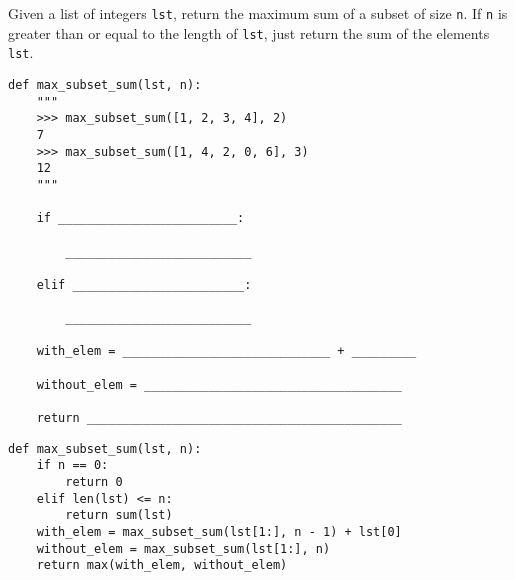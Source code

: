 \question
Given a list of integers \lstinline{lst}, return the maximum sum of a subset of size \lstinline{n}. If \lstinline{n} is greater than or equal to the length of \lstinline{lst}, just return the sum of the elements \lstinline{lst}.

\begin{lstlisting}
def max_subset_sum(lst, n):
    """
    >>> max_subset_sum([1, 2, 3, 4], 2)
    7
    >>> max_subset_sum([1, 4, 2, 0, 6], 3)
    12
    """

    if _________________________:

        __________________________

    elif ________________________:

        __________________________

    with_elem = _____________________________ + _________

    without_elem = ____________________________________

    return ____________________________________________
\end{lstlisting}

\begin{solution}
\begin{lstlisting}
def max_subset_sum(lst, n):
    if n == 0:
        return 0
    elif len(lst) <= n:
        return sum(lst)
    with_elem = max_subset_sum(lst[1:], n - 1) + lst[0]
    without_elem = max_subset_sum(lst[1:], n)
    return max(with_elem, without_elem)
\end{lstlisting}
\end{solution}


